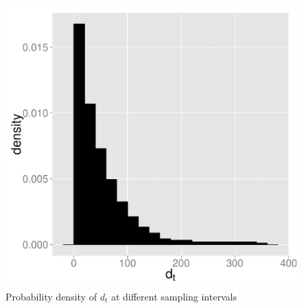 \documentclass{wscpaperproc}
\theoremstyle{wsc}
\begin{document}
\begin{figure}[h]
\begin{minipage}[c]{.3\textwidth}
\end{minipage}
\hspace*{\fill} %
\begin{minipage}[c]{.3\textwidth}
\centering
    \includegraphics[scale=0.25]{70sec.pdf}
    \caption*{$\delta=70 sec$}

\end{minipage}
 \caption{Probability density of $d_{t}$  at different sampling intervals}
\end{figure}
\end{document}
